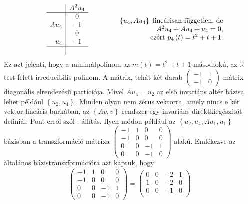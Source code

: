 \documentclass[a4paper, showtrims]{memoir}
\makeatletter
\renewenvironment{proof}[1][\proofname]
    {\par\pushQED{\qed}%
    \normalfont \topsep6\p@\@plus6\p@\relax
    \trivlist
    \item[\hskip\labelsep
        \itshape
    #1\@addpunct{:}]\ignorespaces}
    {\popQED\endtrivlist\@endpefalse}
\theoremstyle{plain}
\theoremstyle{remark}
\theoremstyle{definition}
\makeatother
\begin{document}
\begin{proof}[Megoldás]
\[		\qquad
		\begin{array}{r|c}
			     & A^2u_4 \\
			\hline
			     & 0      \\
			Au_4 & -1     \\
			     & 0      \\
			u_4  & -1     \\
			\hline
			     &
		\end{array}
		\qquad\qquad
		\begin{array}{r}
			\left\{ u_4,Au_4 \right\}\mbox{ lineárisan független, de} \\
			A^2u_4+Au_4+u_4=0,                                        \\
			\mbox{ezért } p_4\left( t \right)=t^2+t+1.
		\end{array}
	\]
	Ez azt jelenti, hogy a minimálpolinom az
	$m\left( t \right)=t^2+t+1$ másodfokú, az $\mathbb{R}$ test felett irreducibilis polinom.
	A mátrix, tehát két darab
	\(
	\begin{pmatrix}
		-1&1 \\
		-1&0
	\end{pmatrix}
	\)
	mátrix diagonális elrendezésű partíciója.
	Mivel $Au_4=u_2$ az első invariáns altér bázisa lehet például
	$
		\left\{
		u_2,u_4
		\right\}
	$. Minden olyan nem zérus vektorra, amely nincs e két vektor lineáris burkában,
	az
	$
		\left\{ Av,v \right\}$
	rendszer egy invariáns direktkiegészítőt definiál.
    Pont erről szól . állítás.
	Ilyen módon például az
	\(
	\left\{
	u_2,u_4,Au_1,u_1
	\right\}
	\)
	bázisban a transzformáció mátrixa
	\(
	\begin{pmatrix}
		-1 & 1 & 0  & 0 \\
		-1 & 0 & 0  & 0 \\
		0  & 0 & -1 & 1 \\
		0  & 0 & -1 & 0
	\end{pmatrix}
	\)
	alakú.
	Emlékezve az általános bázistranszformációra azt kaptuk, hogy
	\[
		\begin{pmatrix}
			-1 & 1 & 0  & 0 \\
			-1 & 0 & 0  & 0 \\
			0  & 0 & -1 & 1 \\
			0  & 0 & -1 & 0
		\end{pmatrix}
		=
		\begin{pmatrix}
			0 & 0 & -2 & 1 \\
			1 & 0 & -2 & 0 \\
			0 & 0 & -1 & 0 \\

\end{pmatrix}\]
\end{proof}
\end{document}
